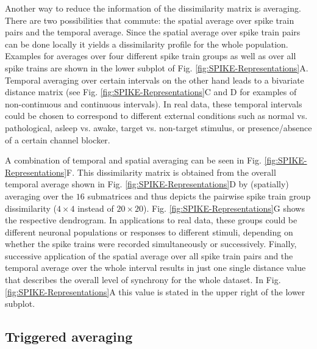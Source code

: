\documentclass[10pt,twocolumn]{elsart5p}
\begin{document}
Another way to reduce the information of the dissimilarity matrix is averaging. There are two possibilities that commute: the spatial average over spike train pairs and the temporal average. Since the spatial average over spike train pairs can be done locally it yields a dissimilarity profile for the whole population. Examples for averages over four different spike train groups as well as over all spike trains are shown in the lower subplot of Fig. \ref{fig:SPIKE-Representations}A. Temporal averaging over certain intervals on the other hand leads to a bivariate distance matrix (see Fig. \ref{fig:SPIKE-Representations}C and D for examples of non-continuous and continuous intervals). In real data, these temporal intervals could be chosen to correspond to different external conditions such as normal vs. pathological, asleep vs. awake, target vs. non-target stimulus, or presence/absence of a certain channel blocker. 

A combination of temporal and spatial averaging can be seen in Fig. \ref{fig:SPIKE-Representations}F. This dissimilarity matrix is obtained from the overall temporal average shown in Fig. \ref{fig:SPIKE-Representations}D by (spatially) averaging over the $16$ submatrices and thus depicts the pairwise spike train group dissimilarity ($4 \times 4$ instead of $20 \times 20$). Fig. \ref{fig:SPIKE-Representations}G shows the respective dendrogram. In applications to real data, these groups could be different neuronal populations or responses to different stimuli, depending on whether the spike trains were recorded simultaneously or successively. Finally, successive application of the spatial average over all spike train pairs and the temporal average over the whole interval results in just one single distance value that describes the overall level of synchrony for the whole dataset. In Fig. \ref{fig:SPIKE-Representations}A this value is stated in the upper right of the lower subplot.


\subsection{\label{ss:Triggered-Averaging} Triggered averaging}
\end{document}
